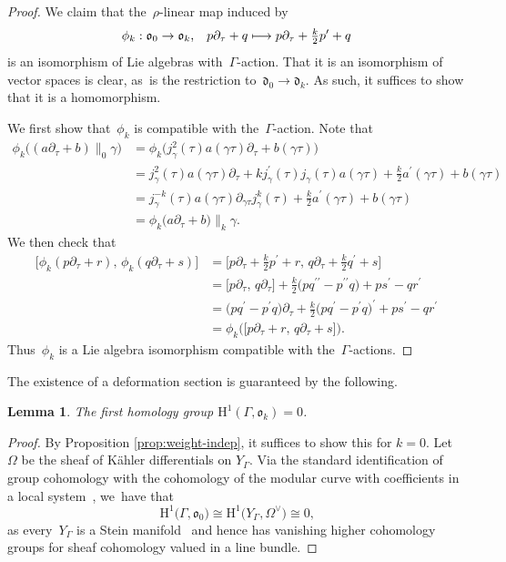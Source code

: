 \documentclass[10pt,a4paper]{article}
\numberwithin{equation}{section}
\theoremstyle{plain}
\newtheorem{lemma}[theoremcounter]{Lemma}
\theoremstyle{definition}
\newcommand{\tx}{\text}
\newcommand{\nbd}{\nobreakdash-\hspace{0pt}}
\newcommand{\frakd}{\ensuremath{\mathfrak{d}}}
\newcommand{\frako}{\ensuremath{\mathfrak{o}}}
\newcommand{\rmH}{\ensuremath{\mathrm{H}}}
\newcommand{\defcol}{\mathrel{:}}
\let\Ga\Gamma
\let\ga\gamma
\newcommand\mto{\mathchoice{\longmapsto}{\mapsto}{\mapsto}{\mapsto}}
\begin{document}
\begin{proof}
We claim that the~$\rho$\nbd{}linear map induced by
\begin{equation*}
\phi_{k}\defcol \frako_0 \to \frako_k
\tx{,}\quad
p\partial_\tau + q \mto p\partial_\tau + \tfrac{k}{2}p^\prime + q
\end{equation*}
is an isomorphism of Lie algebras with~$\Ga$\nbd{}action. That it is an isomorphism of vector spaces is clear, as~is the restriction to~$\frakd_0\to\frakd_k$. As such, it suffices to show that it is a homomorphism.

We first show that~$\phi_k$ is compatible with the~$\Ga$\nbd{}action. Note that
\begin{align*}
\phi_k\bigl((a\partial_\tau+ b)\big\|_0\gamma \bigr)
&= \phi_k\bigl(j_\ga^2(\tau)a(\gamma\tau)\partial_\tau+b(\ga\tau)\bigr) \\
&= j_\ga^2(\tau)a(\ga\tau)\partial_\tau + kj^\prime_\ga(\tau)j_\ga(\tau)a(\ga\tau) + \tfrac{k}{2}a^\prime(\ga\tau)+b(\ga\tau) \\
&= j_\ga^{-k}(\tau)a(\ga\tau)\partial_{\ga\tau} j_\ga^k(\tau) + \tfrac{k}{2}a^\prime(\ga\tau)+b(\ga\tau)\\
&= \phi_k\bigl(a\partial_\tau+ b\bigr)\big\|_k\gamma.
\end{align*}
We then check that
\begin{align*}
\big[ \phi_k(p\partial_\tau + r),\, \phi_k(q\partial_\tau + s) \big]
&= \big[ p\partial_\tau + \tfrac{k}{2}p^\prime + r,\, q\partial_\tau + \tfrac{k}{2}q^\prime + s \big] \\
&= \big[ p\partial_\tau,\, q\partial_\tau \big]
+ \tfrac{k}{2} \bigl(pq^{\prime\prime} -p^{\prime\prime}q\bigr) + ps^\prime - qr^\prime\\
&= \bigl(pq^\prime - p^\prime q\bigr)\partial_\tau
+ \tfrac{k}{2} \bigl(p q^\prime - p^\prime q \bigr)^\prime + ps^\prime - qr^\prime \\
&= \phi_k\bigl(\big[ p\partial_\tau+ r,\, q\partial_\tau+ s \big]\bigr)
\tx{.}
\end{align*}
Thus~$\phi_k$ is a Lie algebra isomorphism compatible with the~$\Ga$\nbd{}actions.
\end{proof}

The existence of a deformation section is guaranteed by the following.

\begin{lemma}\label{lem:vanishing}
The first homology group $\rmH^1(\Ga,\frako_k)=0$.
\end{lemma}
\begin{proof}
By Proposition \ref{prop:weight-indep}, it suffices to show this for $k=0$. Let $\Omega$ be the sheaf of Kähler differentials on $Y_\Ga$. Via the standard identification of group cohomology with the cohomology of the modular curve with coefficients in a local system~\cite{eilenberg45}, we~have that
\begin{equation*}
\rmH^1\bigl(\Ga,\frako_0\bigr)
\cong
\rmH^1\bigl(Y_\Ga, \Omega^{\vee}\bigr) \cong 0
\tx{,}
\end{equation*}
as every~$Y_\Ga$ is a Stein manifold~\cite{behnke47} and hence has vanishing higher cohomology groups for sheaf cohomology valued in a line bundle.
\end{proof}
\end{document}

